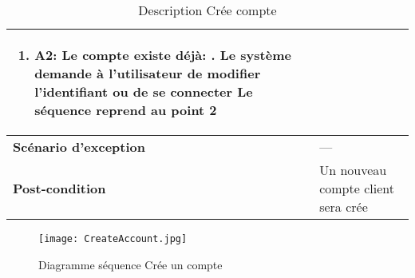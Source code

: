 \begin{center}
\begin{table}[H]
\begin{tabular}{ | l | m{0.51\textheight} |}
{\begin{enumerate}
					\item \textbf{A2: Le compte existe déjà:}
						\subitem 1. Le système demande à l'utilisateur de modifier l'identifiant ou de se connecter\newline
					Le séquence reprend au point 2
				\end{enumerate}}\\
			\hline
			\cellcolor[HTML]{99ccff} \textbf{Scénario d'exception} & --- \\
			\hline
			\cellcolor[HTML]{99ccff} \textbf{Post-condition} & Un nouveau compte client sera crée\\
			\hline
		\end{tabular}
		\caption{Description Crée compte}
		\label{table:create account}
	\end{table}
	\begin{figure}[H]
		\centering
		\texttt{[image: CreateAccount.jpg]}
		\caption{Diagramme séquence Crée un compte}
		\label{fig:seq create account}
	\end{figure}
\end{center}


